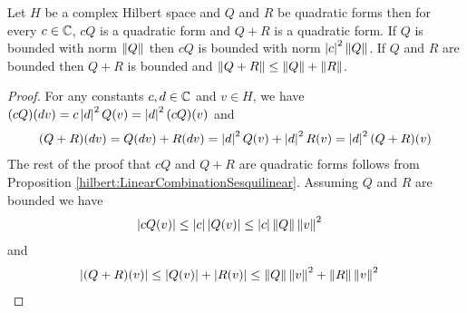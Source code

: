 \begin{prop}\label{hilbert:LinearCombinationOfQuadraticForms}Let $H$ be a complex Hilbert space and $Q$ and $R$ be quadratic forms then for every $c \in \mathbb{C}$, $cQ$ is a quadratic form and $Q + R$ is a quadratic form.  If $Q$ is bounded with norm $\left \lVert Q \right \rVert$ then $cQ$ is bounded with norm $\left \vert c \right \vert^2\left \lVert Q \right \rVert$.  If $Q$ and $R$ are bounded then $Q+R$ is bounded and $\left \lVert Q+R \right \rVert \leq \left \lVert Q \right \rVert + \left \lVert R \right \rVert$. 
\end{prop}
\begin{proof}
For any constants $c, d \in \mathbb{C}$ and $v \in H$, we have $(cQ)(dv) = c \left \vert d \right \vert^2 Q(v) = \left \vert d \right \vert^2 (cQ)(v)$ and 
\begin{align*}
(Q+R) (dv) = Q(dv) + R(dv) = \left \vert d \right \vert^2 Q(v) + \left \vert d \right \vert^2 R(v) = \left \vert d \right \vert^2 (Q+R)(v)
\end{align*}
The rest of the proof that $cQ$ and $Q+R$ are quadratic forms follows from Proposition \ref{hilbert:LinearCombinationSesquilinear}.   Assuming $Q$ and $R$ are bounded we have
\begin{align*}
\left \vert cQ(v) \right \vert &\leq \left \vert c \right \vert\left \vert Q(v) \right \vert \leq \left \vert c \right \vert \left \lVert Q \right \rVert \left \lVert v \right \rVert^2
\end{align*}
and 
\begin{align*}
\left \vert (Q+R)(v) \right \vert &\leq \left \vert Q(v) \right \vert + \left \vert R(v) \right \vert \leq \left \lVert Q \right \rVert \left \lVert v \right \rVert^2 +  \left \lVert R \right \rVert \left \lVert v \right \rVert^2
\end{align*}
\end{proof}

